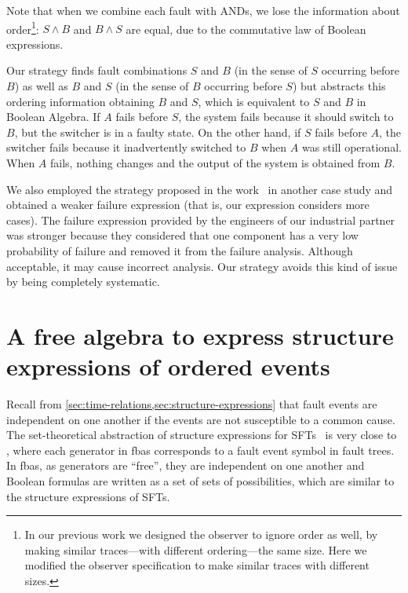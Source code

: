 \documentclass[en,twoside,onehalfspacing,phd]{risethesis}
\begin{document}
Note that when we combine each fault with ANDs, we lose the information about order\footnote{In our previous work we designed the observer to ignore order as well, by making similar traces---with different ordering---the same size. Here we modified the observer specification to make similar traces with different sizes.}: $S \land B$ and $B \land S$ are equal, due to the commutative law of Boolean expressions.

Our strategy finds fault combinations $S$ and $B$ (in the sense of $S$ occurring before $B$) as well as $B$ and $S$ (in the sense of $B$ occurring before $S$) but abstracts this ordering information obtaining $B$ and $S$, which is equivalent to $S$ and $B$ in Boolean Algebra.
%
If $A$ fails before $S$, the system fails because it should switch to $B$, but the switcher is in a faulty state.
%
On the other hand, if $S$ fails before $A$, the switcher fails because it inadvertently switched to $B$ when $A$ was still operational.
%
When $A$ fails, nothing changes and the output of the system is obtained from $B$.

We also employed the strategy proposed in the work~\cite{DM2012} in another case study and obtained a weaker failure expression (that is, our expression considers more cases).
The failure expression provided by the engineers of our industrial partner was stronger because they considered that one component has a very low probability of failure and removed it from the failure analysis.
Although acceptable, it may cause incorrect analysis.
Our strategy avoids this kind of issue by being completely systematic.


\chapter{A free algebra to express structure expressions of ordered events}
\label{sec:strategy}

Recall from \cref{sec:time-relations,sec:structure-expressions} that fault events are independent on one another if the events are not susceptible to a common cause.
The set-theoretical abstraction of structure expressions for \acp{SFT}~\cite[pp. VI-11]{VGR+1981} is very close to , where each generator in \acp{fba} corresponds to a fault event symbol in fault trees.
In \acp{fba}, as generators are ``free'', they are independent on one another and Boolean formulas are written as a set of sets of possibilities, which are similar to the structure expressions of \acp{SFT}.
\end{document}
